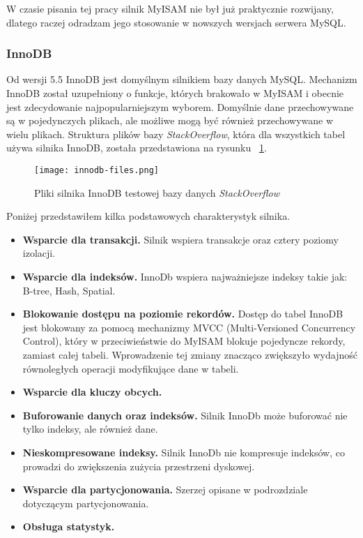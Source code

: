 W czasie pisania tej pracy silnik MyISAM nie był już praktycznie rozwijany, dlatego raczej odradzam jego stosowanie w nowszych wersjach serwera MySQL. 

\subsubsection{InnoDB}
Od wersji 5.5 InnoDB jest domyślnym silnikiem bazy danych MySQL. Mechanizm InnoDB został uzupełniony o funkcje, których brakowało w MyISAM i obecnie jest zdecydowanie najpopularniejszym wyborem. Domyślnie dane przechowywane są w pojedynczych plikach, ale możliwe mogą być również przechowywane w wielu plikach. Struktura plików bazy \textit{StackOverflow}, która dla wszystkich tabel używa silnika InnoDB, została przedstawiona na rysunku ~\ref{fig:innodb-fileslabel}.
\begin{figure}
	\caption{Pliki silnika InnoDB testowej bazy danych \textit{StackOverflow}}
	\centering
	\texttt{[image: innodb-files.png]}
	\label{fig:innodb-fileslabel}
\end{figure}
Poniżej przedstawiłem kilka podstawowych charakterystyk silnika.
\begin{itemize}
	\item \textbf{Wsparcie dla transakcji.} Silnik wspiera transakcje oraz cztery poziomy izolacji.
	\item \textbf{Wsparcie dla indeksów.} InnoDb wspiera najważniejsze indeksy takie jak: B-tree, Hash, Spatial.
	\item \textbf{Blokowanie dostępu na poziomie rekordów. } Dostęp do tabel InnoDB jest blokowany za pomocą mechanizmy MVCC (Multi-Versioned Concurrency Control), który w przeciwieństwie do MyISAM blokuje pojedyncze rekordy, zamiast całej tabeli. Wprowadzenie tej zmiany znacząco zwiększyło wydajność równoległych operacji modyfikujące dane w tabeli.
	\item \textbf{Wsparcie dla kluczy obcych.}
	\item \textbf{Buforowanie danych oraz indeksów.} Silnik InnoDb może buforować nie tylko indeksy, ale również dane.
	\item  \textbf{Nieskompresowane indeksy.} Silnik InnoDb nie kompresuje indeksów, co prowadzi do zwiększenia zużycia przestrzeni dyskowej.
	\item \textbf{Wsparcie dla partycjonowania.} Szerzej opisane w podrozdziale dotyczącym partycjonowania.
	\item \textbf{Obsługa statystyk.}
\end{itemize}


